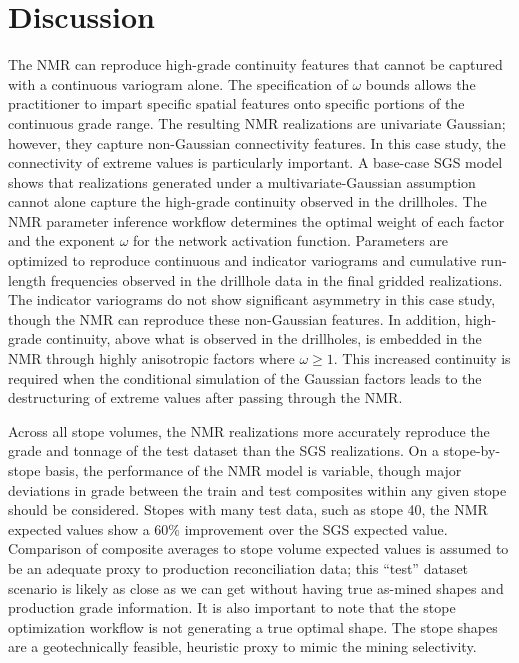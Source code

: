 \FloatBarrier
\section{Discussion}
\label{sec:06discuss}

The \gls{NMR} can reproduce high-grade continuity features that cannot be captured with a continuous variogram alone. The specification of $\omega$ bounds allows the practitioner to impart specific spatial features onto specific portions of the continuous grade range. The resulting \gls{NMR} realizations are univariate Gaussian; however, they capture non-Gaussian connectivity features. In this case study, the connectivity of extreme values is particularly important. A base-case \gls{SGS} model shows that realizations generated under a multivariate-Gaussian assumption cannot alone capture the high-grade continuity observed in the drillholes. The \gls{NMR} parameter inference workflow determines the optimal weight of each factor and the exponent $\omega$ for the network activation function. Parameters are optimized to reproduce continuous and indicator variograms and cumulative run-length frequencies observed in the drillhole data in the final gridded realizations. The indicator variograms do not show significant asymmetry in this case study, though the \gls{NMR} can reproduce these non-Gaussian features. In addition, high-grade continuity, above what is observed in the drillholes, is embedded in the \gls{NMR} through highly anisotropic factors where $\omega \ge 1$. This increased continuity is required when the conditional simulation of the Gaussian factors leads to the destructuring of extreme values after passing through the \gls{NMR}.

Across all stope volumes, the \gls{NMR} realizations more accurately reproduce the grade and tonnage of the test dataset than the \gls{SGS} realizations. On a stope-by-stope basis, the performance of the \gls{NMR} model is variable, though major deviations in grade between the train and test composites within any given stope should be considered. Stopes with many test data, such as stope 40, the \gls{NMR} expected values show a 60\% improvement over the \gls{SGS} expected value. Comparison of composite averages to stope volume expected values is assumed to be an adequate proxy to production reconciliation data; this ``test'' dataset scenario is likely as close as we can get without having true as-mined shapes and production grade information. It is also important to note that the stope optimization workflow is not generating a true optimal shape. The stope shapes are a geotechnically feasible, heuristic proxy to mimic the mining selectivity.


